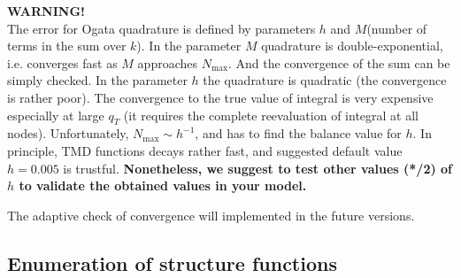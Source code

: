 \documentclass[prd,nofootinbib,eqsecnum,final]{revtex4}
\renewcommand{\(}{\left(}
\renewcommand{\)}{\right)}
\renewcommand{\[}{\left[}
\renewcommand{\]}{\right]}
\begin{document}
\begin{tcolorbox}
\begin{center}
\textbf{WARNING!}
\\
The error for Ogata quadrature is defined by parameters $h$ and $M$(number of terms in the sum over $k$). In the parameter $M$ quadrature is double-exponential, i.e. converges fast as $M$ approaches $N_{\text{max}}$. And the convergence of the sum can be simply checked. In the parameter $h$ the quadrature is quadratic (the convergence is rather poor). The convergence to the true value of integral is very expensive especially at large $q_T$ (it requires the complete reevaluation of integral at all nodes). Unfortunately, $N_{\text{max}}\sim h^{-1}$, and has to find the balance value for $h$. In principle, TMD functions decays rather fast, and suggested default value $h=0.005$ is trustful. \textbf{Nonetheless, we suggest to test other values (*/2) of $h$ to validate the obtained values in your model.}

The adaptive check of convergence will implemented in the future versions.
\end{center}
\end{tcolorbox}

\subsection{Enumeration of structure functions}
\label{TMDF:enum}
\end{document}
